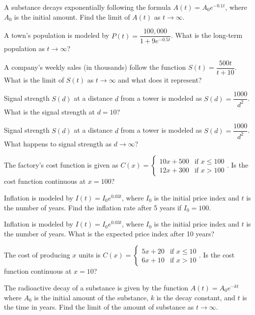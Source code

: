 \documentclass[11pt,a4paper]{article}
\begin{document}
\begin{longlist}
\item A substance decays exponentially following the formula $A(t)=A_0e^{-0.1t}$, where $A_0$ is the initial amount. Find the limit of $A(t)$ as $t\to\infty$.

\item A town's population is modeled by $P(t) = \dfrac{100{,}000}{1+9e^{-0.5t}}$. What is the long-term population as $t\to\infty$?

\item A company's weekly sales (in thousands) follow the function $S(t) = \dfrac{500t}{t+10}$. What is the limit of $S(t)$ as $t\to\infty$ and what does it represent?

\item Signal strength $S(d)$ at a distance $d$ from a tower is modeled as $S(d) = \dfrac{1000}{d^2}$. What is the signal strength at $d=10$?

\item Signal strength $S(d)$ at a distance $d$ from a tower is modeled as $S(d) = \dfrac{1000}{d^2}$. What happens to signal strength as $d\to\infty$?

\item The factory's cost function is given as $C(x) = \begin{cases} 10x+500 & \text{if } x\leq100 \\ 12x+300 & \text{if } x>100 \end{cases}$. Is the cost function continuous at $x=100$?

\item Inflation is modeled by $I(t)=I_0e^{0.03t}$, where $I_0$ is the initial price index and $t$ is the number of years. Find the inflation rate after 5 years if $I_0=100$.

\item Inflation is modeled by $I(t)=I_0e^{0.03t}$, where $I_0$ is the initial price index and $t$ is the number of years. What is the expected price index after 10 years?

\item The cost of producing $x$ units is $C(x) = \begin{cases} 5x+20 & \text{if } x\leq 10 \\ 6x+10 & \text{if } x>10 \end{cases}$. Is the cost function continuous at $x=10$?

\item The radioactive decay of a substance is given by the function $A(t)=A_0e^{-kt}$ where $A_0$ is the initial amount of the substance, $k$ is the decay constant, and $t$ is the time in years. Find the limit of the amount of substance as $t\to\infty$.


\end{longlist}
\end{document}
